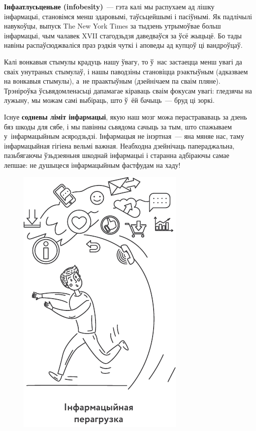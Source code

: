\textbf{Інфаатлусьценьне (infobesity)}~--- гэта калі мы распухаем ад лішку інфармацыі, становімся менш здаровымі, таўсьцейшымі і пасіўнымі. Як падлічылі навукоўцы, выпуск The New York Times за тыдзень утрымоўвае больш інфармацыі, чым чалавек XVII стагодзьдзя даведваўся за ўсё жыцьцё. Бо тады навіны распаўсюджваліся праз рэдкія чуткі і аповеды ад купцоў ці вандроўцаў.

Калі вонкавыя стымулы крадуць нашу ўвагу, то ў~нас застаецца менш увагі да сваіх унутраных стымулаў, і нашы паводзіны становіцца рэактыўным (адказваем на вонкавыя стымулы), а~не праактыўным (дзейнічаем па сваім пляне). Трэніроўка ўсьвядомленасьці дапамагае кіраваць сваім фокусам увагі: гледзячы на лужыну, мы можам самі выбіраць, што ў~ёй бачыць~--- бруд ці зоркі.


Існуе \textbf{содневы ліміт інфармацыі}, якую наш мозг можа перастрававаць за дзень бяз шкоды для сябе, і мы павінны сьвядома сачыць за тым, што спажываем у~інфармацыйным асяродзьдзі. Інфармацыя не інэртная~--- яна мяняе нас, таму інфармацыйная гігіена вельмі важная. Неабходна дзейнічаць папераджальна, пазьбягаючы ўзьдзеяньня шкоднай інфармацыі і старанна адбіраючы самае лепшае: не душыцеся інфармацыйным фастфудам на хаду!

\begin{figure}[htb!]
  \centering
  \includegraphics[scale=1.5]{willpower/ch13/6.pdf}
\end{figure}

